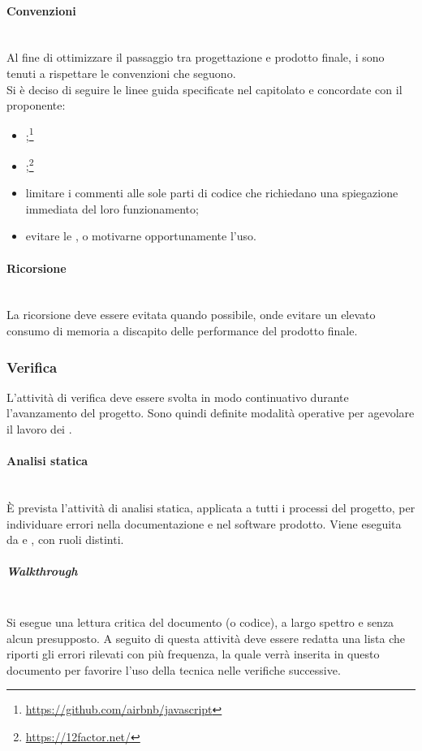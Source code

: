 \paragraph{Convenzioni} \label{sec:convenzioni}\mbox{}\\
Al fine di ottimizzare il passaggio tra progettazione e prodotto finale, i \Programmatori{} sono tenuti a rispettare le convenzioni che seguono.\\
Si è deciso di seguire le linee guida specificate nel capitolato e concordate con il proponente:
\begin{itemize}
	\item {};\footnote{\url{https://github.com/airbnb/javascript}}
	\item {};\footnote{\url{https://12factor.net/}}
	\item limitare i commenti alle sole parti di codice che richiedano una spiegazione immediata del loro funzionamento;
	\item evitare le , o motivarne opportunamente l’uso.
\end{itemize}
\paragraph{Ricorsione}\mbox{}\\
La ricorsione deve essere evitata quando possibile, onde evitare un elevato consumo di memoria a discapito delle performance del prodotto finale.

\subsubsection{Verifica}
L’attività di verifica deve essere svolta in modo continuativo durante l'avanzamento del progetto. Sono quindi definite modalità operative per agevolare il lavoro dei \Verificatori.

\paragraph{Analisi statica}\mbox{}\\
\`{E} prevista l'attività di analisi statica, applicata a tutti i processi del progetto, per individuare errori nella documentazione e nel software prodotto. Viene eseguita da \Verificatori{} e \Programmatori{}, con ruoli distinti.

\subparagraph{Walkthrough} \mbox{}\\
Si esegue una lettura critica del documento (o codice), a largo spettro e senza alcun presupposto. A seguito di questa attività deve essere redatta una lista che riporti gli errori rilevati con più frequenza, la quale verrà inserita in questo documento per favorire l'uso della tecnica  nelle verifiche successive.


